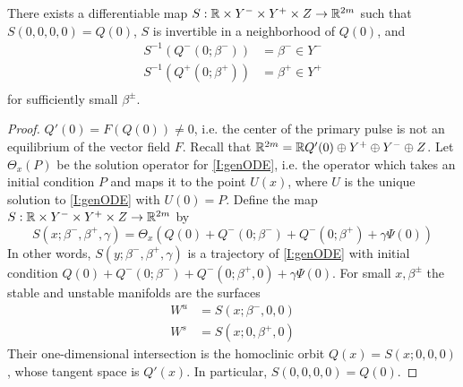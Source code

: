 \documentclass[thesis.tex]{subfiles}
\begin{document}
\begin{lemma}\label{straightenW}
There exists a differentiable map $S: {\mathbb R} \times Y^- \times Y^+ \times Z \rightarrow {\mathbb R}^{2m}$ such that $S(0, 0, 0, 0) = Q(0)$, $S$ is invertible in a neighborhood of $Q(0)$, and
\begin{align*}
S^{-1}(Q^-(0; \beta^-)) &= \beta^- \in Y^- \\
S^{-1}(Q^+(0; \beta^+)) &= \beta^+ \in Y^+ \\
\end{align*}
for sufficiently small $\beta^\pm$.
\begin{proof}
$Q'(0) = F(Q(0)) \neq 0$, i.e. the center of the primary pulse is not an equilibrium of the vector field $F$. Recall that ${\mathbb R}^{2m} = {\mathbb R} Q'(0) \oplus Y^+ \oplus Y^- \oplus Z$. Let $\Theta_x(P)$ be the solution operator for \eqref{I:genODE}, i.e. the operator which takes an initial condition $P$ and maps it to the point $U(x)$, where $U$ is the unique solution to \eqref{I:genODE} with $U(0) = P$. Define the map $S: {\mathbb R} \times Y^- \times Y^+ \times Z \rightarrow {\mathbb R}^{2m}$ by 
\begin{equation}\label{flowboxdefS}
S(x; \beta^-, \beta^+, \gamma) = \Theta_x\left(Q(0) + Q^-(0; \beta^-) + Q^-(0; \beta^+) + \gamma \Psi(0)\right)
\end{equation}
In other words, $S(y; \beta^-, \beta^+, \gamma)$ is a trajectory of \eqref{I:genODE} with initial condition $Q(0) + Q^-(0; \beta^-) + Q^-(0; \beta^+,0) + \gamma \Psi(0)$. For small $x, \beta^\pm$ the stable and unstable manifolds are the surfaces
\begin{align*}
W^u &= S(x; \beta^-, 0, 0) \\
W^s &= S(x; 0, \beta^+, 0) 
\end{align*}
Their one-dimensional intersection is the homoclinic orbit $Q(x) = S(x; 0, 0, 0)$, whose tangent space is $Q'(x)$. In particular, $S(0, 0, 0, 0) = Q(0)$.


\end{proof}
\end{lemma}
\end{document}
